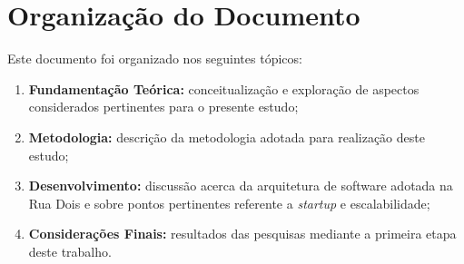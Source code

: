 \section{Organização do Documento}

Este documento foi organizado nos seguintes tópicos:

  \begin{enumerate}
    \item \textbf{Fundamentação Teórica:} conceitualização e exploração de
    aspectos considerados pertinentes para o presente estudo;
    \item \textbf{Metodologia:} descrição da metodologia adotada para
    realização deste estudo;
    \item \textbf{Desenvolvimento:} discussão acerca da arquitetura de
    software adotada na Rua Dois e sobre pontos pertinentes referente a
    \textit{startup} e escalabilidade;
    \item \textbf{Considerações Finais:} resultados das pesquisas mediante a
    primeira etapa deste trabalho.
  \end{enumerate}

